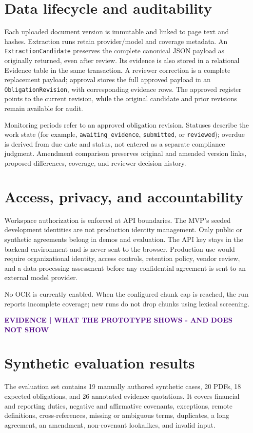 \documentclass[10pt]{article}
\newcommand{\eyebrow}[1]{\textcolor{indigo}{\small\bfseries\MakeUppercase{#1}}}
\newcommand{\smallnote}[1]{\textcolor{muted}{\small #1}}
\begin{document}
\section{Data lifecycle and auditability}
Each uploaded document version is immutable and linked to page text and hashes. Extraction runs retain provider/model and coverage metadata. An \texttt{ExtractionCandidate} preserves the complete canonical JSON payload as originally returned, even after review. Its evidence is also stored in a relational Evidence table in the same transaction. A reviewer correction is a complete replacement payload; approval stores the full approved payload in an \texttt{ObligationRevision}, with corresponding evidence rows. The approved register points to the current revision, while the original candidate and prior revisions remain available for audit.

Monitoring periods refer to an approved obligation revision. Statuses describe the work state (for example, \texttt{awaiting\_evidence}, \texttt{submitted}, or \texttt{reviewed}); overdue is derived from due date and status, not entered as a separate compliance judgment. Amendment comparison preserves original and amended version links, proposed differences, coverage, and reviewer decision history.

\section{Access, privacy, and accountability}
Workspace authorization is enforced at API boundaries. The MVP's seeded development identities are not production identity management. Only public or synthetic agreements belong in demos and evaluation. The API key stays in the backend environment and is never sent to the browser. Production use would require organizational identity, access controls, retention policy, vendor review, and a data-processing assessment before any confidential agreement is sent to an external model provider.

\smallnote{No OCR is currently enabled. When the configured chunk cap is reached, the run reports incomplete coverage; new runs do not drop chunks using lexical screening.}

\newpage
\eyebrow{Evidence | What the prototype shows - and does not show}
\section{Synthetic evaluation results}
The evaluation set contains 19 manually authored synthetic cases, 20 PDFs, 18 expected obligations, and 26 annotated evidence quotations. It covers financial and reporting duties, negative and affirmative covenants, exceptions, remote definitions, cross-references, missing or ambiguous terms, duplicates, a long agreement, an amendment, non-covenant lookalikes, and invalid input.
\end{document}
